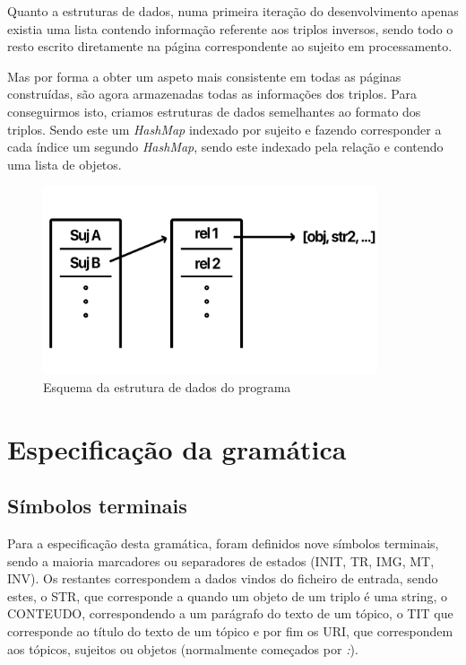 \documentclass[a4paper]{report}
\begin{document}
Quanto a estruturas de dados, numa primeira iteração do desenvolvimento apenas
existia uma lista contendo informação referente aos triplos inversos, sendo todo
o resto escrito diretamente na página correspondente ao sujeito em
processamento. 

Mas por forma a obter um aspeto mais consistente em todas as páginas
construídas, são agora armazenadas todas as informações dos triplos.
Para conseguirmos isto, criamos estruturas de dados semelhantes ao formato dos
triplos. Sendo este um \textit{HashMap} indexado por sujeito e fazendo
corresponder a cada índice um segundo \textit{HashMap}, sendo este indexado pela
relação e contendo uma lista de objetos.

\begin{figure}[H]
    \centering
    \includegraphics[width=0.88\textwidth]{data_struct.png}
    \caption{Esquema da estrutura de dados do programa}
\end{figure}

\section{Especificação da gramática}

\subsection{Símbolos terminais}

Para a especificação desta gramática, foram definidos nove símbolos terminais,
sendo a maioria marcadores ou separadores de estados (INIT, TR, IMG, MT, INV).
Os restantes correspondem a dados vindos do ficheiro de entrada, sendo estes, o
STR, que corresponde a quando um objeto de um triplo é uma string, o CONTEUDO,
correspondendo a um parágrafo do texto de um tópico, o TIT que corresponde ao
título do texto de um tópico e por fim os URI, que correspondem aos tópicos,
sujeitos ou objetos (normalmente começados por \textit{:}).
\end{document}
